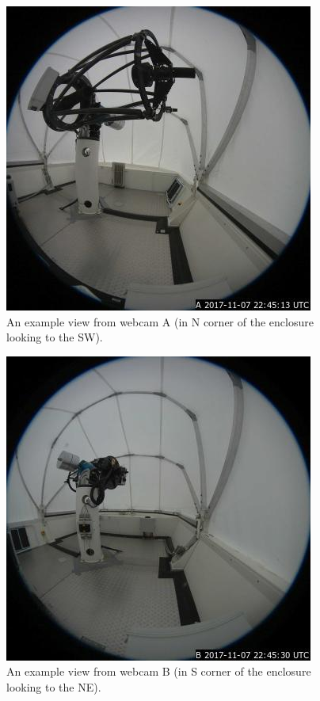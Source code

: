 \begin{figure}
\begin{center}
\includegraphics[width=0.8\linewidth]{figures/interface-coatlioan-webcam-a.jpg}
\end{center}
\caption{An example view from webcam A (in N corner of the enclosure looking to the SW).}
\label{figure:interface-webcam-a}
\end{figure}

\begin{figure}
\begin{center}
\includegraphics[width=0.8\linewidth]{figures/interface-coatlioan-webcam-b.jpg}
\end{center}
\caption{An example view from webcam B (in S corner of the enclosure looking to the NE).}
\label{figure:interface-webcam-b}
\end{figure}

